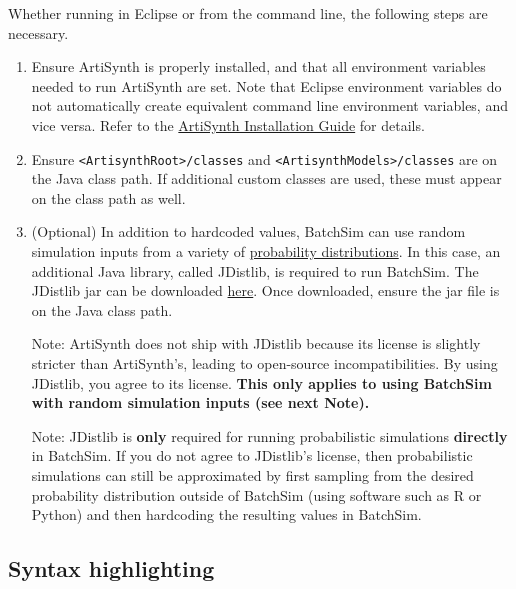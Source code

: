 \documentclass{article}
\newcommand{\AS}{<ArtisynthRoot>}
\newcommand{\AM}{<ArtisynthModels>}
\begin{document}
Whether running in Eclipse or from the command line, the following steps are necessary.

\begin{enumerate}

\item Ensure ArtiSynth is properly installed, and that all environment variables needed to run ArtiSynth are set. Note that Eclipse environment variables do not automatically create equivalent command line environment variables, and vice versa. Refer to the \href{https://www.artisynth.org/Documentation/InstallGuide}{ArtiSynth Installation Guide} for details.

\item Ensure {\tt \AS/classes} and {\tt \AM/classes} are on the Java class path. If additional custom classes are used, these must appear on the class path as well.

\item (Optional) In addition to hardcoded values, BatchSim can use random simulation inputs from a variety of \href{https://en.wikipedia.org/wiki/Probability_distribution}{probability distributions}. In this case, an additional Java library, called JDistlib, is required to run BatchSim. The JDistlib jar can be downloaded \href{http://jdistlib.sourceforge.net/}{here}. Once downloaded, ensure the jar file is on the Java class path.

\begin{sideblock}
Note: ArtiSynth does not ship with JDistlib because its license is slightly stricter than ArtiSynth's, leading to open-source incompatibilities. By using JDistlib, you agree to its license. \textbf{This only applies to using BatchSim with random simulation inputs (see next Note).}
\end{sideblock}

\begin{sideblock}
Note: JDistlib is \textbf{only} required for running probabilistic simulations \textbf{directly} in BatchSim. If you do not agree to JDistlib's license, then probabilistic simulations can still be approximated by first sampling from the desired probability distribution outside of BatchSim (using software such as R or Python) and then hardcoding the resulting values in BatchSim.
\end{sideblock}

\end{enumerate}

\subsection{Syntax highlighting}
\end{document}
